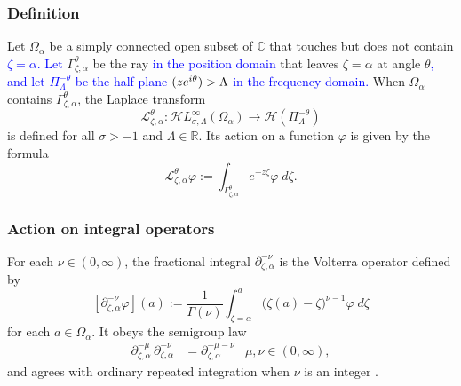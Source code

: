 \documentclass[review]{siamart220329}
\newcommand{\maps}{\colon}
\newcommand{\R}{\mathbb{R}}
\newcommand{\C}{\mathbb{C}}
\let\Re\relax
\DeclareMathOperator{\Re}{Re}
\newcommand{\laplace}{\mathcal{L}}
\newcommand{\fracderiv}[3]{\partial^{#1}_{#2, #3}}
\newcommand{\holo}{\mathcal{H}}
\newcommand{\singexp}[2]{\mathcal{H}L^\infty_{#1, #2}}
\newcommand{\domain}{\Omega}
\begin{document}
\subsubsection{Definition}
Let $\domain_\alpha$ be a simply connected open subset of $\C$ that touches but does not contain \textcolor{blue}{$\zeta=\alpha$. Let} $\Gamma_{\zeta, \alpha}^\theta$ be the ray \textcolor{blue}{in the position domain} that leaves $\zeta=\alpha$ at angle $\theta$\textcolor{blue}{, and let $\Pi^{-\theta}_\Lambda$ be the half-plane $\Re(z e^{i\theta}) > \Lambda$ in the frequency domain.} When $\domain_\alpha$ contains $\Gamma_{\zeta, \alpha}^\theta$, \color{blue}the Laplace transform
\[ \laplace_{\zeta, \alpha}^{\theta} \maps \singexp{\sigma}{\Lambda}(\domain_\alpha) \to \holo(\Pi^{-\theta}_\Lambda) \]
is defined for all $\sigma > -1$ and $\Lambda \in \R$. Its action on a function $\varphi$ is given by the formula
\begin{equation}\label{laplace:int}
\laplace_{\zeta, \alpha}^{\theta} \varphi := \int_{\Gamma_{\zeta,\alpha}^\theta} e^{-z\zeta} \varphi\;d\zeta.
\end{equation}
\color{black}
\subsubsection{Action on integral operators}\label{sec:L-int-op}
For each $\nu \in (0, \infty)$, the fractional integral $\partial^{-\nu}_{\zeta, \alpha}$ is the Volterra operator defined by
\[ [\partial^{-\nu}_{\zeta, \alpha} \varphi](a) := \frac{1}{\Gamma(\nu)} \int_{\zeta = \alpha}^a \big(\zeta(a)-\zeta\big)^{\nu-1} \varphi\;d\zeta \]
for each $a \in \domain_\alpha$. It obeys the semigroup law \cite[Section~1.3]{mladenov2014advanced}
\begin{align*}
\fracderiv{-\mu}{\zeta}{\alpha}\,\fracderiv{-\nu}{\zeta}{\alpha} & = \fracderiv{-\mu-\nu}{\zeta}{\alpha} & \mu, \nu \in (0, \infty),
\end{align*}
and agrees with ordinary repeated integration when $\nu$ is an integer \cite[equation~35]{mladenov2014advanced}.
\end{document}
